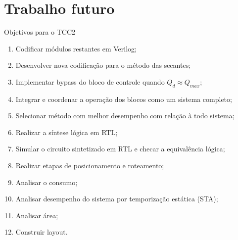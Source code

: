 \section{Trabalho futuro}

\begin{frame}[shrink]{Objetivos para o TCC2}

\begin{enumerate}
    \item Codificar módulos restantes em Verilog;
    \item Desenvolver nova codificação para o método das secantes;
    \item Implementar bypass do bloco de controle quando $Q_d \approx Q_{max}$;
    \item Integrar e coordenar a operação dos blocos como um sistema completo;
    \item Selecionar método com melhor desempenho com relação à todo sistema;
    \item Realizar a síntese lógica em RTL;
    \item Simular o circuito sintetizado em RTL e checar a equivalência lógica;
    \item Realizar etapas de posicionamento e roteamento;
    \item Analisar o consumo;
    \item Analisar desempenho do sistema por temporização estática (STA);
    \item Analisar área;
    \item Construir layout.
\end{enumerate}

\end{frame}



